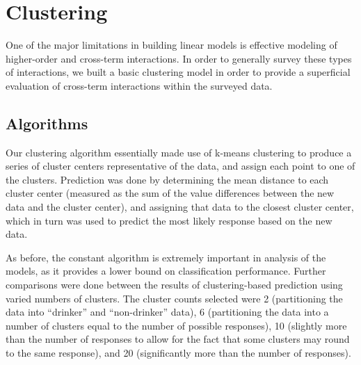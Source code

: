 \section{Clustering}
\label{sec:clustering}

One of the major limitations in building linear models is effective modeling of higher-order and cross-term interactions.  In order to generally survey these types of interactions, we built a basic clustering model in order to provide a superficial evaluation of cross-term interactions within the surveyed data.

\subsection{Algorithms}

Our clustering algorithm essentially made use of k-means clustering to produce a series of cluster centers representative of the data, and assign each point to one of the clusters.  Prediction was done by determining the mean distance to each cluster center (measured as the sum of the value differences between the new data and the cluster center), and assigning that data to the closest cluster center, which in turn was used to predict the most likely response based on the new data.

As before, the constant algorithm is extremely important in analysis of the models, as it provides a lower bound on classification performance.  Further comparisons were done between the results of clustering-based prediction using varied numbers of clusters.  The cluster counts selected were 2 (partitioning the data into ``drinker'' and ``non-drinker'' data), 6 (partitioning the data into a number of clusters equal to the number of possible responses), 10 (slightly more than the number of responses to allow for the fact that some clusters may round to the same response), and 20 (significantly more than the number of responses).

